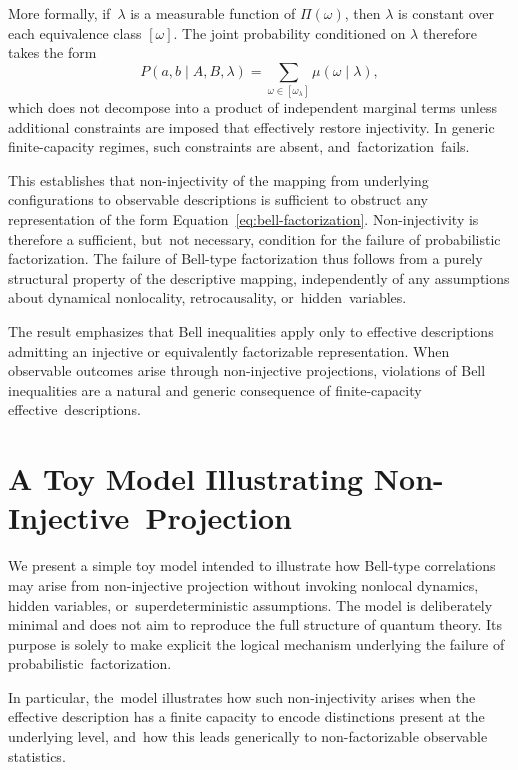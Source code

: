 \documentclass[11pt,a4paper]{article}
\theoremstyle{remark}
\begin{document}
  More formally, if~$\lambda$ is a measurable function of $\Pi(\omega)$, then $\lambda$
  is constant over each equivalence class $[\omega]$.
  The joint probability conditioned on $\lambda$ therefore takes the form
\begin{equation}
    P(a,b \mid A,B,\lambda)
    =
    \sum_{\omega \in [\omega_\lambda]} \mu(\omega \mid \lambda),
  \end{equation}
  which does not decompose into a product of independent marginal terms unless
  additional constraints are imposed that effectively restore injectivity.
  In generic finite-capacity regimes, such constraints are absent, and~factorization~fails.

  This establishes that non-injectivity of the mapping from underlying configurations
  to observable descriptions is sufficient to obstruct any representation of the form
  \mbox{Equation~\eqref{eq:bell-factorization}}.
  Non-injectivity is therefore a sufficient, but~not necessary, condition for the
  failure of probabilistic factorization.
  The failure of Bell-type factorization thus follows from a purely structural property
  of the descriptive mapping, independently of any assumptions about dynamical
  nonlocality, retrocausality, or~hidden~variables.

  The result emphasizes that Bell inequalities apply only to effective descriptions
  admitting an injective or equivalently factorizable representation.
  When observable outcomes arise through non-injective projections, violations of Bell
  inequalities are a natural and generic consequence of finite-capacity effective~descriptions.

  \section{A Toy Model Illustrating Non-Injective~Projection}
  \label{app:toy-model}

  We present a simple toy model intended to illustrate how Bell-type correlations may
  arise from non-injective projection without invoking nonlocal dynamics, hidden
  variables, or~superdeterministic assumptions.
  The model is deliberately minimal and does not aim to reproduce the full structure of quantum theory.
  Its purpose is solely to make explicit the logical mechanism underlying the failure
  of probabilistic~factorization.

  In particular, the~model illustrates how such non-injectivity arises when the
  effective description has a finite capacity to encode distinctions present at the
  underlying level, and~how this leads generically to non-factorizable observable
  statistics.
\end{document}
